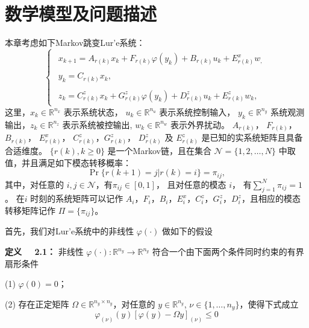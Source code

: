 \section{数学模型及问题描述}
	本章考虑如下Markov跳变Lur'e系统：
	\begin{equation}\label{syseq}\left\{
	\begin{array}{lr}
		\begin{split}
			x_{k+1}=A_{r(k)}x_k+F_{r(k)}\varphi(y_k)+B_{r(k)}u_k +E^x_{r(k)}w_,
		\end{split}\\
		\begin{split}
			y_k=C_{r(k)}x_k,
		\end{split}
		\\
		\begin{split}
			z_k= C^z_{r(k)}x_k+G^z_{r(k)}\varphi(y_k)+D^z_{r(k)}u_k+E^z_{r(k)}w_k,
		\end{split}	
	\end{array}\right.
	\end{equation}
	这里，$x_k\in\mathbb{R}^{n_x}$ 表示系统状态， $u_k\in\mathbb{R}^{n_u}$ 表示系统控制输入， $y_k\in\mathbb{R}^{n_y}$ 系统观测输出，$ z_k\in\mathbb{R}^{n_z}$ 表示系统被控输出, $w_k\in\mathbb{R}^{n_w}$ 表示外界扰动。 $A_{r(k)}$， $F_{r(k)}$， $B_{r(k)}$， $E^x_{r(k)}$， $C^z_{r(k)}$，$G^z_{r(k)}$， $D^z_{r(k)}$ 及 $E^z_{r(k)}$ 是已知的实系统矩阵且具备合适维度。
	$\{r(k),k\geq0\}$ 是一个Markov链，且在集合 $\mathcal{N}=\{1,2,\dots,N\}$ 中取值，并且满足如下模态转移概率：
	\begin{equation}
	\Pr\{r(k+1)=j|r(k)=i\}=\pi_{ij},
	\end{equation}
	其中，对任意的 $i,j\in\mathcal{N}$，有$\pi_{ij}\in[0,1]$， 且对任意的模态 $i$， 有$\sum_{j=1}^{N}\pi_{ij}=1$。 在$i$ 时刻的系统矩阵可以记作 $A_i$，$F_i$，$B_i$，$E^x_i$，$C^z_i$，$G^z_i$，$D^z_i$，且相应的模态转移矩阵记作 $\varPi=\{\pi_{ij}\}$。
	
	首先，我们对Lur'e系统中的非线性 $\varphi(\cdot)$ 做如下的假设
	
	{\bf 定义 \ \ 2.1：} 
	非线性 $\varphi(\cdot): \mathbb{R}^{n_y}\rightarrow\mathbb{R}^{n_y}$ 符合一个由下面两个条件同时约束的有界扇形条件
		
		(1) $\varphi(0)=0$；
		
		(2) 存在正定矩阵 $\varOmega \in\mathbb{R}^{n_y\times n_y}$，对任意的 $y\in\mathbb{R}^{n_y}$, $\nu \in\{1,\dots,n_y\}$，使得下式成立 
		\begin{equation}\label{cbs} 
		\varphi_{(\nu)}(y)[\varphi(y)-\varOmega y ]_{(\nu)}\leq 0
		\end{equation}
		
